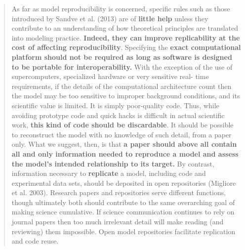 \documentclass[sigconf,screen,nonacm]{acmart}
\begin{document}
\begin{quote}
As far as model reproducibility is concerned, specific rules such as
those introduced by Sandve et al. (2013) are of \textbf{little help}
unless they contribute to an understanding of how theoretical
principles are translated into modeling practice.\textbf{ Indeed, they
  can improve replicability at the cost of affecting
  reproducibility}. Specifying the\textbf{ exact computational
  platform should not be required as long as software is designed to
  be portable for interoperability.} With the exception of the use of
supercomputers, specialized hardware or very sensitive real- time
requirements, if the details of the computational architecture count
then the model may be too sensitive to improper background conditions,
and its scientific value is limited. It is simply poor-quality
code. Thus, while avoiding prototype code and quick hacks is difficult
in actual scientific work, \textbf{this kind of code should be
  discardable}. It should be possible to reconstruct the model with no
knowledge of such detail, from a paper only.  What we suggest, then,
is that \textbf{a paper should above all contain all and only
  information needed to reproduce a model and assess the model's
  intended relationship to its target.} By contrast, information
necessary to \textbf{replicate} a model, including code and
experimental data sets, should be deposited in open repositories
(Migliore et al. 2003). Research papers and repositories serve
different functions, though ultimately both should contribute to the
same overarching goal of making science cumulative. If science
communication continues to rely on journal papers then too much
irrelevant detail will make reading (and reviewing) them
impossible. Open model repositories facilitate replication and code
reuse.
\end{quote}
\end{document}
